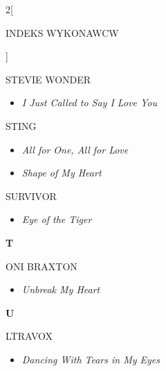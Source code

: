 \documentclass[a4paper]{report}
\begin{document}
\begin{multicols*}{2}[\begin{Huge}INDEKS WYKONAWCW\end{Huge}\vspace{1cm}]
\begin{minipage}{\columnwidth}
\end{minipage}
\begin{minipage}{\columnwidth}
	STEVIE WONDER 
	\begin{itemize}[topsep=3pt, after=\vspace{3mm}]
		\itemsep0em
		\item[]\textit{I Just Called to Say I Love You}  \\
	\end{itemize}
\end{minipage}
\begin{minipage}{\columnwidth}
	STING 
	\begin{itemize}[topsep=3pt, after=\vspace{3mm}]
		\itemsep0em
		\item[]\textit{All for One, All for Love}  \\
		\item[]  \textit{Shape of My Heart}  \\
	\end{itemize}
\end{minipage}
\begin{minipage}{\columnwidth}
	SURVIVOR 
	\begin{itemize}[topsep=3pt, after=\vspace{3mm}]
		\itemsep0em
		\item[]\textit{Eye of the Tiger}  \\
	\end{itemize}
\end{minipage}
\begin{minipage}{\columnwidth}
	\begin{Large}\textbf{T}\end{Large}ONI BRAXTON 
	\begin{itemize}[topsep=3pt, after=\vspace{3mm}]
		\itemsep0em
		\item[]\textit{Unbreak My Heart}  \\
	\end{itemize}
\end{minipage}
\begin{minipage}{\columnwidth}
	\begin{Large}\textbf{U}\end{Large}LTRAVOX 
	\begin{itemize}[topsep=3pt, after=\vspace{3mm}]
		\itemsep0em
		\item[]\textit{Dancing With Tears in My Eyes}  \\

\end{itemize}
\end{minipage}
\end{multicols*}
\end{document}
